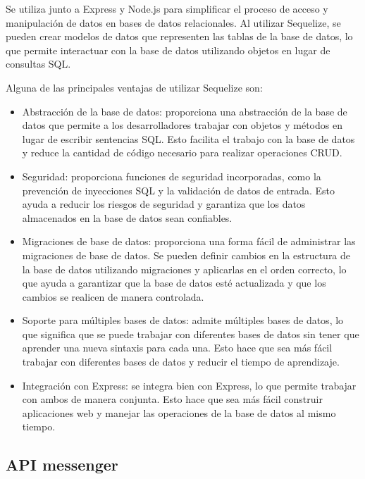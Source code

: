 Se utiliza junto a Express y Node.js para simplificar el proceso de acceso y manipulación de datos en bases de datos relacionales. Al utilizar Sequelize, se pueden crear modelos de datos que representen las tablas de la base de datos, lo que permite interactuar con la base de datos utilizando objetos en lugar de consultas SQL.

Alguna de las principales ventajas de utilizar Sequelize son:

\begin{itemize}
\item Abstracción de la base de datos: proporciona una abstracción de la base de datos que permite a los desarrolladores trabajar con objetos y métodos en lugar de escribir sentencias SQL. Esto facilita el trabajo con la base de datos y reduce la cantidad de código necesario para realizar operaciones CRUD.

\item Seguridad: proporciona funciones de seguridad incorporadas, como la prevención de inyecciones SQL y la validación de datos de entrada. Esto ayuda a reducir los riesgos de seguridad y garantiza que los datos almacenados en la base de datos sean confiables.

\item Migraciones de base de datos: proporciona una forma fácil de administrar las migraciones de base de datos. Se pueden definir cambios en la estructura de la base de datos utilizando migraciones y aplicarlas en el orden correcto, lo que ayuda a garantizar que la base de datos esté actualizada y que los cambios se realicen de manera controlada.

\item Soporte para múltiples bases de datos: admite múltiples bases de datos, lo que significa que se puede trabajar con diferentes bases de datos sin tener que aprender una nueva sintaxis para cada una. Esto hace que sea más fácil trabajar con diferentes bases de datos y reducir el tiempo de aprendizaje.

\item Integración con Express: se integra bien con Express, lo que permite trabajar con ambos de manera conjunta. Esto hace que sea más fácil construir aplicaciones web y manejar las operaciones de la base de datos al mismo tiempo.

\end{itemize}

\subsection{API messenger}
\label{subsec:apimessenger}

